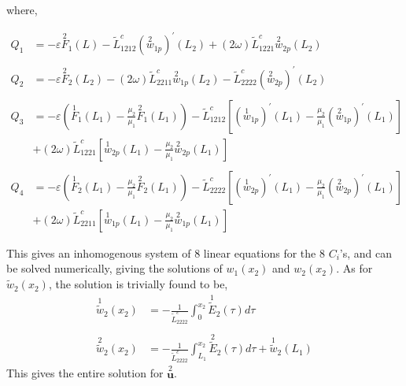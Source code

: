 \documentclass[11pt]{report}
\begin{document}
\begin{appendices}
where,
\begin{small}
\begin{equation*}
\begin{aligned}
Q_1 &= - \varepsilon \overset{2}{F}_1(L) - \tilde{L}^c_{1212} \left( \overset{2}{w}_{1p} \right)^\prime(L_2) + (2 \omega) \tilde{L}^c_{1221} \overset{2}{w}_{2p}(L_2) \\
\\
Q_2 &= - \varepsilon \overset{2}{F}_2(L_2) - (2 \omega) \tilde{L}^c_{2211} \overset{2}{w}_{1p}(L_2) - \tilde{L}^c_{2222} \left( \overset{2}{w}_{2p} \right)^\prime(L_2) \\
\\
Q_3 &= -\varepsilon \left( \overset{1}{F}_1(L_1) - \frac{\mu_2}{\mu_1} \overset{2}{F}_1(L_1) \right) - \tilde{L}^c_{1212} \left[ \left( \overset{1}{w}_{1p} \right)^\prime (L_1) - \frac{\mu_2}{\mu_1} \left( \overset{2}{w}_{1p} \right)^\prime (L_1) \right] \\
&+ (2 \omega) \tilde{L}^c_{1221} \left[ \overset{1}{w}_{2p}(L_1) - \frac{\mu_2}{\mu_1} \overset{2}{w}_{2p}(L_1) \right] \\
\\
Q_4 &= -\varepsilon \left( \overset{1}{F}_2(L_1) - \frac{\mu_2}{\mu_1}\overset{2}{F}_2(L_1) \right) - \tilde{L}^c_{2222} \left[ \left( \overset{1}{w}_{2p} \right)^\prime (L_1) - \frac{\mu_2}{\mu_1} \left( \overset{2}{w}_{2p} \right)^\prime (L_1) \right] \\
&+ (2 \omega) \tilde{L}^c_{2211} \left[ \overset{1}{w}_{1p}(L_1) - \frac{\mu_2}{\mu_1} \overset{2}{w}_{1p}(L_1) \right]
\end{aligned}
\end{equation*}
\end{small}

This gives an inhomogenous system of 8 linear equations for the 8 $C_i$'s, and can be solved numerically, giving the solutions of $w_1(x_2)$ and $w_2(x_2)$. As for $\widetilde{w}_2(x_2)$, the solution is trivially found to be,
\begin{equation}
\begin{aligned}
\overset{1}{\widetilde{w}}_2(x_2) &= -\frac{1}{\tilde{L}^c_{2222}} \int_0^{x_2} \overset{1}{\widetilde{E}}_2(\tau) d\tau \\
\\
\overset{2}{\widetilde{w}}_2(x_2) &= -\frac{1}{\tilde{L}^c_{2222}} \int_{L_1}^{x_2} \overset{2}{\widetilde{E}}_2(\tau) d\tau + \overset{1}{\widetilde{w}}_2(L_1)
\end{aligned} 
\end{equation}
This gives the entire solution for $\overset{2}{\mathbf{u}}$.

\end{appendices}
\end{document}
